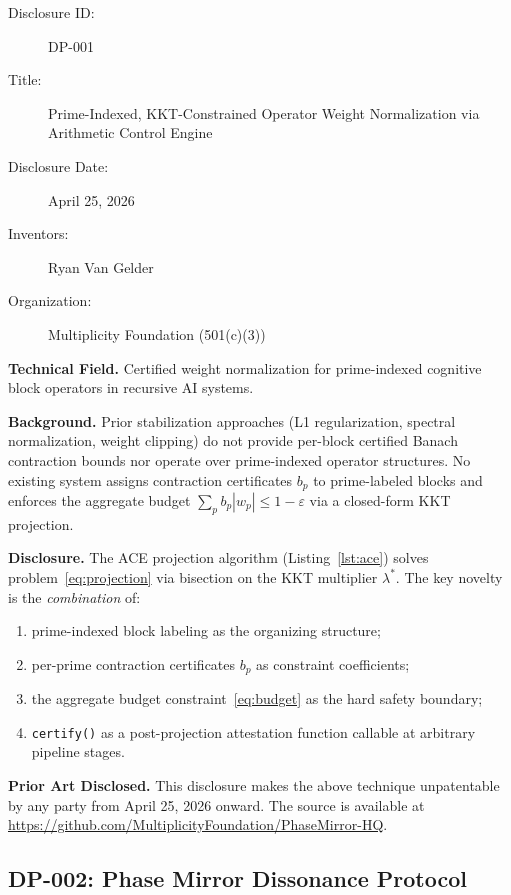\documentclass[12pt,letterpaper]{article}
\begin{document}
\begin{description}
  \item[Disclosure ID:] DP-001
  \item[Title:] Prime-Indexed, KKT-Constrained Operator Weight
    Normalization via Arithmetic Control Engine
  \item[Disclosure Date:] April 25, 2026
  \item[Inventors:] Ryan Van Gelder
  \item[Organization:] Multiplicity Foundation (501(c)(3))
\end{description}

\textbf{Technical Field.} Certified weight normalization for
prime-indexed cognitive block operators in recursive AI systems.

\textbf{Background.} Prior stabilization approaches (L1 regularization,
spectral normalization, weight clipping) do not provide per-block
certified Banach contraction bounds nor operate over prime-indexed
operator structures. No existing system assigns contraction certificates
$b_p$ to prime-labeled blocks and enforces the aggregate budget
$\sum_p b_p |w_p| \leq 1 - \varepsilon$ via a closed-form KKT
projection.

\textbf{Disclosure.} The ACE projection algorithm (Listing~\ref{lst:ace})
solves problem~\eqref{eq:projection} via bisection on the KKT multiplier
$\lambda^*$. The key novelty is the \emph{combination} of:
\begin{enumerate}
  \item prime-indexed block labeling as the organizing structure;
  \item per-prime contraction certificates $b_p$ as constraint
        coefficients;
  \item the aggregate budget constraint~\eqref{eq:budget} as the
        hard safety boundary;
  \item \texttt{certify()} as a post-projection attestation function
        callable at arbitrary pipeline stages.
\end{enumerate}

\textbf{Prior Art Disclosed.} This disclosure makes the above technique
unpatentable by any party from April 25, 2026 onward. The source is
available at
\url{https://github.com/MultiplicityFoundation/PhaseMirror-HQ}.

\subsection{DP-002: Phase Mirror Dissonance Protocol}
\end{document}
